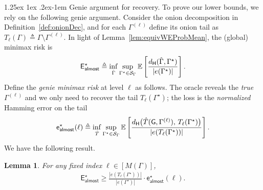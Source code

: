 \documentclass[12pt]{article}
\makeatletter
\newtheorem{lemma}{Lemma}
\newcommand{\calS}{{\cal S}}
\newcommand{\s}[1]{\mathsf{#1}}
\renewcommand{\paragraph}{%
  \@startsection{paragraph}{4}%
  {\z@}{1.25ex \@plus 1ex \@minus .2ex}{-1em}%
  {\normalfont\normalsize\bfseries}%
}
\makeatother
\begin{document}
\paragraph{Genie argument for recovery.}
To prove our lower bounds, we rely on the following genie argument. Consider the onion decomposition in Definition~\ref{def:onionDec}, and for each $\Gamma^{(\ell)}$ define its onion tail as $T_\ell(\Gamma) \triangleq \Gamma \setminus \Gamma^{(\ell)}$. In light of Lemma~\ref{lem:equivWEProbMean}, the (global) minimax risk is
\begin{align}
\s{E}^\star_{\s{almost}}\triangleq \inf_{\hat\Gamma}\sup_{\Gamma^\star\in\mathcal \calS_\Gamma}
\mathbb E\left[\frac{d_{\s{H}}(\hat\Gamma,\Gamma^\star)}{|e(\Gamma^\star)|}\right].
\end{align}
Define the \emph{genie minimax risk} at level $\ell$ as follows. The oracle reveals the \emph{true} $\Gamma^{(\ell)}$ and we only need to recover the tail $T_\ell(\Gamma^\star)$;  the loss is the \emph{normalized} Hamming error on the tail
\begin{align}
\s{e}_{\s{almost}}^\star(\ell)\triangleq \inf_{\hat T}\sup_{\Gamma^\star\in\calS_\Gamma}
\mathbb E\left[\frac{d_{\s{H}}\big(\hat T(\s{G},\Gamma^{(\ell)}),\,T_\ell(\Gamma^\star)\big)}{|e(T_\ell(\Gamma^\star))|}\right].\label{eqn:lossGenPar}
\end{align}
We have the following result.
\begin{lemma}\label{lem:genWeak}
    For any fixed index $\ell\in[M(\Gamma)]$,
\begin{align}
\s{E}^\star_{\s{almost}}\geq\frac{|e(T_\ell(\Gamma^\star))|}{|e(\Gamma^\star)|}\cdot\s{e}_{\s{almost}}^\star(\ell).
\end{align}
\end{lemma}
\end{document}
